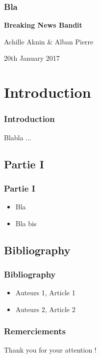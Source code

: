 \documentclass[french]{beamer}
\begin{document}
		\begin{frame}
		\frametitle{Bla}
		\begin{center}
		\Large{\textbf{Breaking News Bandit}}
		\vspace{20pt}
		\end{center}
	
	\begin{center}
	Achille Aknin \& Alban Pierre

	20th January 2017
	\end{center}
		\end{frame}
	
	\begin{frame}
	
  \tableofcontents[]
\end{frame} 

	\section{Introduction}
	\begin{frame}
	\frametitle{Introduction}
	
	Blabla ...
	
	\end{frame}
	
	\begin{frame}
	\section{Partie I}
	\frametitle{Partie I}
	
	\begin{itemize}
		\item Bla
		\item Bla bis
	\end{itemize}
	\end{frame}
	
	\begin{frame}
	\section{Bibliography}
		
		\frametitle{Bibliography}
		\scriptsize{
		\begin{itemize}	
			\item Auteurs 1,  Article 1
			
			\item Auteurs 2,  Article 2
			
		\end{itemize}
	}
	\end{frame}
	
	\begin{frame}
	\frametitle{Remerciements}
	
	Thank you for your attention !
	
	\end{frame}
\end{document}
